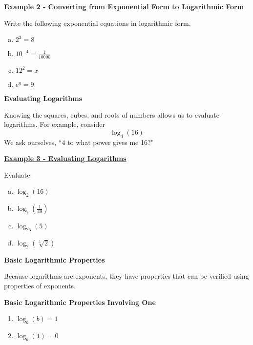 \documentclass[12pt]{book}
\newcommand{\D}{\displaystyle}
\begin{document}
\vspace{5mm}

\underline{\textbf{Example 2 - Converting from Exponential Form to Logarithmic Form}}

Write the following exponential equations in logarithmic form.
\vspace{2mm}
\begin{enumerate}[(a)]
    \item $\D 2^3=8$
    \vspace{30mm}
    \item $ \D 10^{-4} = \frac{1}{10000}$
    \vspace{30mm}
    \item $12^2=x$
    \vspace{30mm}
    \item $e^y=9$
\end{enumerate}
\newpage


{\large \textbf{Evaluating Logarithms}}

Knowing the squares, cubes, and roots of numbers allows us to evaluate logarithms. For example, consider $$\log_4(16)$$ We ask ourselves, ``$4$ to what power gives me 16?"

\vspace{10mm}


\underline{\textbf{Example 3 - Evaluating Logarithms}}

Evaluate: 
\begin{enumerate}[(a)]
    \item $\D \log_2(16)$
    \vspace{3mm}
    \item $\D \log_7\left(\frac{1}{49}\right)$
    \vspace{3mm}
    \item $\D \log_{25}(5)$
    \vspace{3mm}
    \item $\D \log_2(\sqrt[5]{2})$
\end{enumerate}
\vspace{50mm}


\newpage
{\large \textbf{Basic Logarithmic Properties}}

Because logarithms are exponents, they have properties that can be verified using properties of exponents.
\vspace{1mm}

\begin{boxR}
    \textbf{Basic Logarithmic Properties Involving One}
    \vspace{1mm}
    \hline
    \vspace{2mm}
    \begin{enumerate}
        \item $\D\log_b(b)=1$
        \vspace{1mm}
        \item $\D \log_b(1)=0$
    \end{enumerate}
\end{boxR}
\vspace{3mm}
\end{document}
